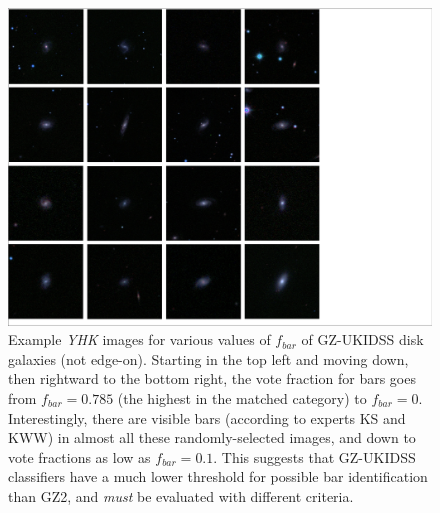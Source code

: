 \documentclass[useAMS,usenatbib]{mn2e}
\begin{document}
\begin{figure}
\includegraphics[scale=0.6]{figures/bar_decreasing_images.pdf}
\caption{
    Example \emph{YHK} images for various values of $f_{bar}$ of GZ-UKIDSS disk galaxies (not edge-on). Starting in the top left and moving down, then rightward to the bottom right, the vote fraction for bars goes from $f_{bar}=0.785$ (the highest in the matched category) to $f_{bar}=0$. Interestingly, there are visible bars (according to experts KS and KWW) in almost all these randomly-selected images, and down to vote fractions as low as $f_{bar}=0.1$. This suggests that GZ-UKIDSS classifiers have a much lower threshold for possible bar identification than GZ2, and \emph{must} be evaluated with different criteria.
}
\label{fig:images}
\end{figure}
%
\end{document}

